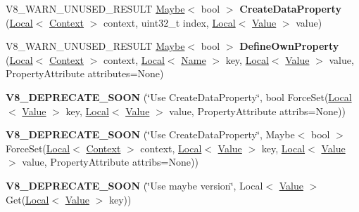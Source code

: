 \begin{DoxyCompactItemize}
\item 
\hypertarget{classv8_1_1Object_aec3a99813837c0bc6444c59f8e5ca22a}{}V8\+\_\+\+W\+A\+R\+N\+\_\+\+U\+N\+U\+S\+E\+D\+\_\+\+R\+E\+S\+U\+L\+T \hyperlink{classv8_1_1Maybe}{Maybe}$<$ bool $>$ {\bfseries Create\+Data\+Property} (\hyperlink{classv8_1_1Local}{Local}$<$ \hyperlink{classv8_1_1Context}{Context} $>$ context, uint32\+\_\+t index, \hyperlink{classv8_1_1Local}{Local}$<$ \hyperlink{classv8_1_1Value}{Value} $>$ value)\label{classv8_1_1Object_aec3a99813837c0bc6444c59f8e5ca22a}

\item 
\hypertarget{classv8_1_1Object_a65f44f92b7ee9d479ce6b3ebb9ac8d4b}{}V8\+\_\+\+W\+A\+R\+N\+\_\+\+U\+N\+U\+S\+E\+D\+\_\+\+R\+E\+S\+U\+L\+T \hyperlink{classv8_1_1Maybe}{Maybe}$<$ bool $>$ {\bfseries Define\+Own\+Property} (\hyperlink{classv8_1_1Local}{Local}$<$ \hyperlink{classv8_1_1Context}{Context} $>$ context, \hyperlink{classv8_1_1Local}{Local}$<$ \hyperlink{classv8_1_1Name}{Name} $>$ key, \hyperlink{classv8_1_1Local}{Local}$<$ \hyperlink{classv8_1_1Value}{Value} $>$ value, Property\+Attribute attributes=None)\label{classv8_1_1Object_a65f44f92b7ee9d479ce6b3ebb9ac8d4b}

\item 
\hypertarget{classv8_1_1Object_a860fc8955b4e2bc05ec6a3ffefdd5d4c}{}{\bfseries V8\+\_\+\+D\+E\+P\+R\+E\+C\+A\+T\+E\+\_\+\+S\+O\+O\+N} (\char`\"{}Use Create\+Data\+Property\char`\"{}, bool Force\+Set(\hyperlink{classv8_1_1Local}{Local}$<$ \hyperlink{classv8_1_1Value}{Value} $>$ key, \hyperlink{classv8_1_1Local}{Local}$<$ \hyperlink{classv8_1_1Value}{Value} $>$ value, Property\+Attribute attribs=None))\label{classv8_1_1Object_a860fc8955b4e2bc05ec6a3ffefdd5d4c}

\item 
\hypertarget{classv8_1_1Object_ad27cf6f073e9a84f056f3858dc92ee64}{}{\bfseries V8\+\_\+\+D\+E\+P\+R\+E\+C\+A\+T\+E\+\_\+\+S\+O\+O\+N} (\char`\"{}Use Create\+Data\+Property\char`\"{}, Maybe$<$ bool $>$ Force\+Set(\hyperlink{classv8_1_1Local}{Local}$<$ \hyperlink{classv8_1_1Context}{Context} $>$ context, \hyperlink{classv8_1_1Local}{Local}$<$ \hyperlink{classv8_1_1Value}{Value} $>$ key, \hyperlink{classv8_1_1Local}{Local}$<$ \hyperlink{classv8_1_1Value}{Value} $>$ value, Property\+Attribute attribs=None))\label{classv8_1_1Object_ad27cf6f073e9a84f056f3858dc92ee64}

\item 
\hypertarget{classv8_1_1Object_a15c40cda73a1927bef406b85032d5564}{}{\bfseries V8\+\_\+\+D\+E\+P\+R\+E\+C\+A\+T\+E\+\_\+\+S\+O\+O\+N} (\char`\"{}Use maybe version\char`\"{}, Local$<$ \hyperlink{classv8_1_1Value}{Value} $>$ Get(\hyperlink{classv8_1_1Local}{Local}$<$ \hyperlink{classv8_1_1Value}{Value} $>$ key))\label{classv8_1_1Object_a15c40cda73a1927bef406b85032d5564}


\end{DoxyCompactItemize}
